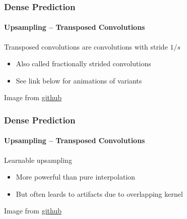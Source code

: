 \documentclass[xetex,professionalfont]{beamer}
\renewcommand\emph[1]{\textcolor{tuwcvl_cvl_blue}{#1}}
\begin{document}
\begin{frame}
	\frametitle{Dense Prediction}
	\framesubtitle{Upsampling -- Transposed Convolutions}

	\emph{Transposed convolutions} are convolutions with stride $1/s$ %
	\begin{itemize}
		\item Also called \emph{fractionally strided convolutions}
		\item See link below for animations of variants
	\end{itemize}

	\medskip

	\begin{center}
		{\centering Image from \href{https://github.com/vdumoulin/conv\_arithmetic}{github}}
	\end{center}

\end{frame}


\begin{frame}
	\frametitle{Dense Prediction}
	\framesubtitle{Upsampling -- Transposed Convolutions}

	Learnable upsampling
	\begin{itemize}
		\item More powerful than pure interpolation
		\item But often leards to artifacts due to overlapping kernel
	\end{itemize}

	\medskip

	\begin{center}
		{\centering Image from \href{https://github.com/vdumoulin/conv\_arithmetic}{github}}
	\end{center}

\end{frame}
\end{document}

